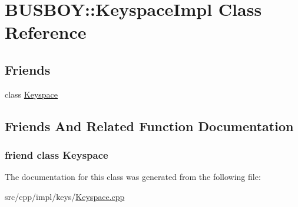 \hypertarget{classBUSBOY_1_1KeyspaceImpl}{
\section{BUSBOY::KeyspaceImpl Class Reference}
\label{classBUSBOY_1_1KeyspaceImpl}
}
\subsection*{Friends}
\begin{DoxyCompactItemize}
\item 
class \hyperlink{classBUSBOY_1_1KeyspaceImpl_ac84a835335322ee38da5eafa3a45c343}{Keyspace}
\end{DoxyCompactItemize}


\subsection{Friends And Related Function Documentation}
\hypertarget{classBUSBOY_1_1KeyspaceImpl_ac84a835335322ee38da5eafa3a45c343}{
\subsubsection[{Keyspace}]{\setlength{\rightskip}{0pt plus 5cm}friend class {\bf Keyspace}}}
\label{classBUSBOY_1_1KeyspaceImpl_ac84a835335322ee38da5eafa3a45c343}


The documentation for this class was generated from the following file:\begin{DoxyCompactItemize}
\item 
src/cpp/impl/keys/\hyperlink{Keyspace_8cpp}{Keyspace.cpp}\end{DoxyCompactItemize}
